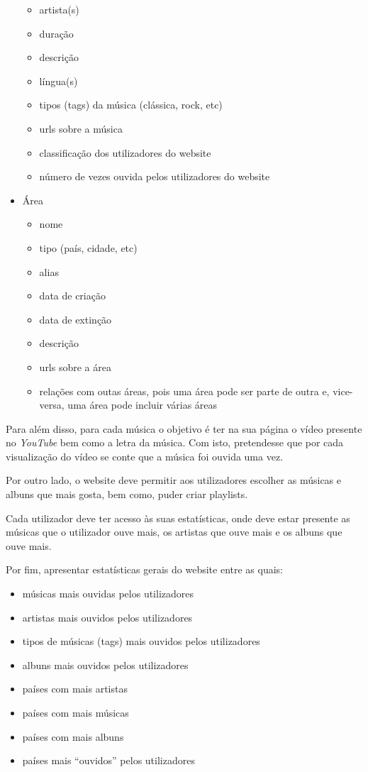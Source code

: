 \documentclass{article}
\begin{document}
\begin{itemize}
\begin{itemize}
            \item artista(s)
            \item duração
            \item descrição
            \item língua(s)
            \item tipos (tags) da música (clássica, rock, etc)
            \item urls sobre a música
            \item classificação dos utilizadores do website
            \item número de vezes ouvida pelos utilizadores do website
        \end{itemize}
    \item Área
        \begin{itemize}
            \item nome
            \item tipo (país, cidade, etc)
            \item alias
            \item data de criação
            \item data de extinção
            \item descrição
            \item urls sobre a área
            \item relações com outas áreas, pois uma área pode ser parte de outra e, vice-versa, uma área pode incluir várias áreas
        \end{itemize}
\end{itemize}

Para além disso, para cada música o objetivo é ter na sua página o vídeo presente no \textit{YouTube} bem como a letra da música. Com isto, pretendesse que por cada visualização do vídeo se conte que a música foi ouvida uma vez.

Por outro lado, o website deve permitir aos utilizadores escolher as músicas e albuns que mais gosta, bem como, puder criar playlists.

Cada utilizador deve ter acesso às suas estatísticas, onde deve estar presente as músicas que o utilizador ouve mais, os artistas que ouve mais e os albuns que ouve mais.

Por fim, apresentar estatísticas gerais do website entre as quais:
\begin{itemize}
    \item músicas mais ouvidas pelos utilizadores
    \item artistas mais ouvidos pelos utilizadores
    \item tipos de músicas (tags) mais ouvidos pelos utilizadores
    \item albuns mais ouvidos pelos utilizadores
    \item países com mais artistas
    \item países com mais músicas
    \item países com mais albuns
    \item países mais ``ouvidos'' pelos utilizadores
\end{itemize}
\end{document}
